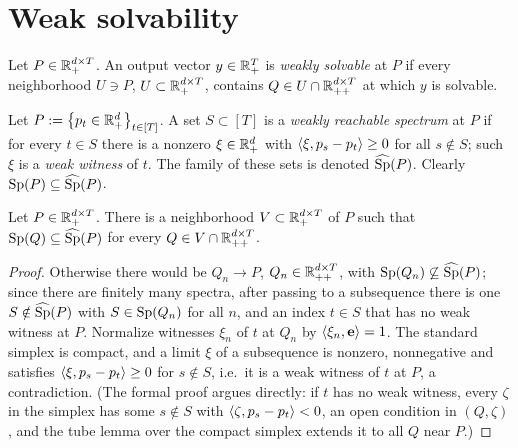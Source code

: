 \section{Weak solvability}\label{sec:weak}

\begin{definition}\label{def:weak-solvability}
Let $P\in\Rp[d\times T]$. An output vector $y\in\Rp[T]$ is \emph{weakly solvable} at $P$ if every neighborhood $U\ni P$, $U\subset\Rp[d\times T]$, contains $Q\in U\cap\Rpp[d\times T]$ at which $y$ is solvable.
\end{definition}

\begin{definition}\label{def:weak}
Let $P:=\set{p_t\in\Rp[d]}_{t\in[T]}$. A set $S\subset[T]$ is a \emph{weakly reachable spectrum} at $P$ if for every $t\in S$ there is a nonzero $\xi\in\Rp[d]$ with $\ip{\xi}{p_s-p_t}\ge0$ for all $s\notin S$; such $\xi$ is a \emph{weak witness} of $t$. The family of these sets is denoted $\wSp(P)$. Clearly $\Sp(P)\subseteq\wSp(P)$.
\end{definition}

\begin{lemma}[limit]\label{lem:limit}
Let $P\in\Rp[d\times T]$. There is a neighborhood $V\subset\Rp[d\times T]$ of $P$ such that $\Sp(Q)\subseteq\wSp(P)$ for every $Q\in V\cap\Rpp[d\times T]$.
\end{lemma}

\begin{proof}
Otherwise there would be $Q_n\to P$, $Q_n\in\Rpp[d\times T]$, with $\Sp(Q_n)\not\subseteq\wSp(P)$; since there are finitely many spectra, after passing to a subsequence there is one $S\notin\wSp(P)$ with $S\in\Sp(Q_n)$ for all $n$, and an index $t\in S$ that has no weak witness at $P$. Normalize witnesses $\xi_n$ of $t$ at $Q_n$ by $\ip{\xi_n}{\e}=1$. The standard simplex is compact, and a limit $\xi$ of a subsequence is nonzero, nonnegative and satisfies $\ip{\xi}{p_s-p_t}\ge0$ for $s\notin S$, i.e.\ it is a weak witness of $t$ at $P$, a contradiction. (The formal proof argues directly: if $t$ has no weak witness, every $\zeta$ in the simplex has some $s\notin S$ with $\ip\zeta{p_s-p_t}<0$, an open condition in $(Q,\zeta)$, and the tube lemma \citep[Lemma~26.8]{Munkres2000} over the compact simplex extends it to all $Q$ near $P$.)
\end{proof}

